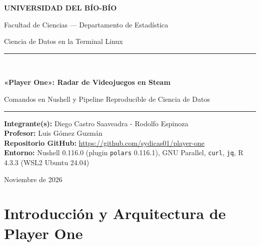 \documentclass[11pt,a4paper]{article}
\begin{document}
\begin{titlepage}
    \centering
    \vspace*{1.5cm}
    {\Large \textbf{UNIVERSIDAD DEL BÍO-BÍO}\par}
    \vspace{0.2cm}
    {\large Facultad de Ciencias --- Departamento de Estadística\par}
    \vspace{0.2cm}
    {\normalsize Ciencia de Datos en la Terminal Linux\par}

    \vspace{2.5cm}
    \rule{\textwidth}{0.8pt}\\[0.5cm]
    {\LARGE \textbf{«Player One»: Radar de Videojuegos en Steam}\par}
    \vspace{0.3cm}
    {\large Comandos en Nushell y Pipeline Reproducible de Ciencia de Datos\par}
    \rule{\textwidth}{0.8pt}

    \vspace{2.5cm}
    \begin{flushleft}
        \large
        \textbf{Integrante(s):}  Diego Castro Saaveadra - Rodolfo Espinoza \\[0.3cm]
        \textbf{Profesor:} Luis Gómez Guzmán \\[0.3cm]
        \textbf{Repositorio GitHub:} \url{https://github.com/sydicas01/player-one} \\[0.3cm]
        \textbf{Entorno:} Nushell 0.116.0 (plugin \texttt{polars} 0.116.1), GNU Parallel, \texttt{curl}, \texttt{jq}, R 4.3.3 (WSL2 Ubuntu 24.04)
    \end{flushleft}

    \vfill
    {\large Noviembre de 2026\par}
\end{titlepage}

\tableofcontents
\newpage

\section{Introducción y Arquitectura de Player One}
\end{document}
